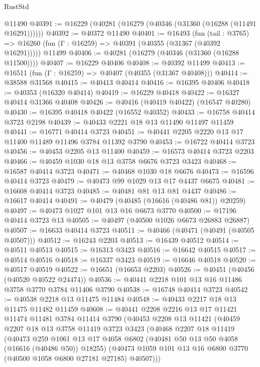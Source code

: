 \begin{lexlean}{RustStd}
\begin{coremodule}
    @11490
@40391 := @16229 (@40281 (@16279 (@40346 (@31360 (@16288 (@11491 @16291))))))
@40392 := @40372 @11490
@40401 := @16493
    (fun (tail : @3765) => @16260 (fun (Γ : @16259) => @40391 (@40355 (@31367 (@40392 @16291)))))
    @11499
@40406 := @40281 (@16279 (@40346 (@31360 (@16288 @11500))))
@40407 := @16229 @40406
@40408 := @40392 @11499
@40413 := @16511 (fun (Γ : @16259) => @40407 (@40355 (@31367 @40408)))
@40414 := @38588 @31568
@40415 := @40413 @40414
@40416 := @16395 @40406
@40418 := @40353 (@16320 @40414)
@40419 := @16229 @40418
@40422 := @16327 @40414 @31366 @40408
@40426 := @40416 (@40419 @40422) (@16547 @40280)
@40430 := @16395 @40418 @40422 (@16552 @40352)
@40433 := @16758 @40414 @3723 @2198
@40439 := @40433 @2221 @18 @13 @11490 @11497 @11459
@40441 := @16771 @40414 @3723
@40451 := @40441 @2205 @2220 @13 @17 @11400 @11489 @11496 @3784 @11392 @3790
@40453 := @16722 @40414 @3723
@40456 := @40453 @2205 @13 @11400
@40459 := @16573 @40414 @3723 @2203
@40466 := @40459 @1030 @18 @13 @3758 @6676 @3723 @3423
@40468 := @16587 @40414 @3723
@40471 := @40468 @1030 @18 @6676
@40473 := @16596 @40414 @3723
@40479 := @40473 @99 @1029 @13 @17 @4437 @6675
@40481 := @16608 @40414 @3723
@40485 := @40481 @81 @13 @81 @4437
@40486 := @16617 @40414
@40491 := @40479 (@40485 (@16616 (@40486 @81)) @20259)
@40497 := @40473 @1027 @101 @13 @16 @6673 @3770
@40500 := @17196 @40414 @3723 @13
@40505 := @40497 (@40500 @1026 @6673 @26883 @26887)
@40507 := @16633 @40414 @3723
@40511 := @40466 (@40471 (@40491 (@40505 @40507)))
@40512 := @16243 @2203
@40513 := @16439 @40512
@40514 := @40511 @40513
@40515 := @16313 @3423
@40516 := @16642 @40515
@40517 := @40514 @40516
@40518 := @16337 @3423
@40519 := @16646 @40518
@40520 := @40517 @40519
@40522 := @16651 (@16653 @2203)
@40526 := @40451 (@40456 (@40520 @40522 @24474))
@40536 := @40441 @2218 @101 @13 @16 @11486 @3758 @3770 @3784 @11406 @3790
@40538 := @16748 @40414 @3723
@40542 := @40538 @2218 @13 @11475 @11484
@40548 := @40433 @2217 @18 @13 @11475 @11482 @11459
@40608 := @40441
    @2208
    @2216
    @13
    @17
    @11421
    @11474
    @11481
    @3784
    @11414
    @3790
    (@40453
      @2208
      @13
      @11421
      (@40459
        @2207
        @18
        @13
        @3758
        @11419
        @3723
        @3423
        (@40468
          @2207
          @18
          @11419
          (@40473
            @259
            @1061
            @13
            @17
            @4058
            @6802
            (@40481 @50 @13 @50 @4058 (@16616 (@40486 @50)) @18255)
            (@40473 @1059 @101 @13 @16 @6800 @3770 (@40500 @1058 @6800 @27181 @27185) @40507)))

\end{coremodule}
\end{lexlean}
